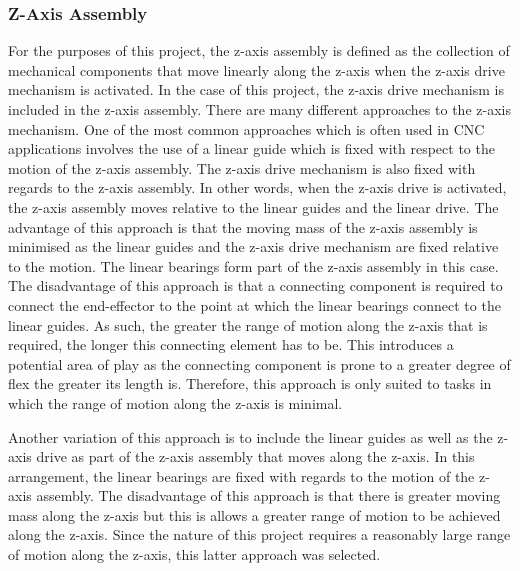\subsubsection{Z-Axis Assembly}

For the purposes of this project, the z-axis assembly is defined as the collection of mechanical components that move linearly along the z-axis when the z-axis drive mechanism is activated. In the case of this project, the z-axis drive mechanism is included in the z-axis assembly. There are many different approaches to the z-axis mechanism. One of the most common approaches which is often used in CNC applications involves the use of a linear guide which is fixed with respect to the motion of the z-axis assembly. The z-axis drive mechanism is also fixed with regards to the z-axis assembly. In other words, when the z-axis drive is activated, the z-axis assembly moves relative to the linear guides and the linear drive. The advantage of this approach is that the moving mass of the z-axis assembly is minimised as the linear guides and the z-axis drive mechanism are fixed relative to the motion. The linear bearings form part of the z-axis assembly in this case. The disadvantage of this approach is that a connecting component is required to connect the end-effector to the point at which the linear bearings connect to the linear guides. As such, the greater the range of motion along the z-axis that is required, the longer this connecting element has to be. This introduces a potential area of play as the connecting component is prone to a greater degree of flex the greater its length is. Therefore, this approach is only suited to tasks in which the range of motion along the z-axis is minimal.

Another variation of this approach is to include the linear guides as well as the z-axis drive as part of the z-axis assembly that moves along the z-axis. In this arrangement, the linear bearings are fixed with regards to the motion of the z-axis assembly. The disadvantage of this approach is that there is greater moving mass along the z-axis but this is allows a greater range of motion to be achieved along the z-axis. Since the nature of this project requires a reasonably large range of motion along the z-axis, this latter approach was selected.

